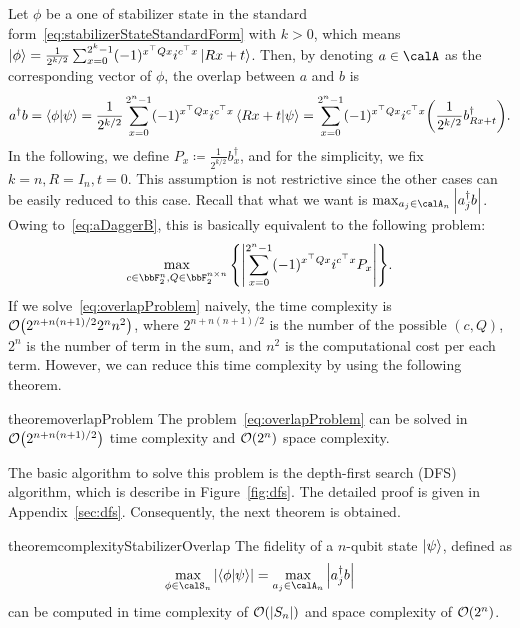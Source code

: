 \documentclass[a4paper, onecolumn, 11pt, longbibliography]{quantumarticle}
\newcommand{\defeq}{\coloneqq}
\begin{document}
Let $\phi$ be a one of stabilizer state
in the standard form~\eqref{eq:stabilizerStateStandardForm}
with $k>0$, which means
$\ket{\phi} = \frac{1}{2^{k/2}}\sum_{x=0}^{2^k-1} (-1)^{x^\top Q x} i^{c^\top x} \ket{Rx+t}$.
Then, by denoting $a \in \calA$ as the corresponding vector of $\phi$,
the overlap between $a$ and $b$ is
\begin{equation}\label{eq:aDaggerB}
  a^\dagger b
  = \braket{\phi}{\psi}
  = \frac{1}{2^{k/2}} \sum_{x=0}^{2^n-1} (-1)^{x^\top Q x} i^{c^\top x} \braket{Rx+t}{\psi}
  = \sum_{x=0}^{2^n-1} (-1)^{x^\top Q x} i^{c^\top x} \qty(\frac{1}{2^{k/2}}b_{Rx+t}^\dagger).
\end{equation}
In the following, we define $P_x \defeq \frac{1}{2^{k/2}}b_x^\dagger$,
and for the simplicity, we fix $k=n,R=I_n,t=0$.
This assumption is not restrictive since
the other cases can be easily reduced to this case.
Recall that what we want is
$\max_{a_j \in \calA_n} \abs{a_j^\dagger b}$.
Owing to~\eqref{eq:aDaggerB},
this is basically equivalent to the following problem:
\begin{equation}\label{eq:overlapProblem}
  \max_{c\in \bbF_2^{n},Q\in \bbF_2^{n \times n}} \qty{ \abs{\sum_{x=0}^{2^n-1} (-1)^{x^\top Q x} i^{c^\top x} P_x} }.
\end{equation}
If we solve~\eqref{eq:overlapProblem} naively,
the time complexity is $\order{2^{n+n(n+1)/2} 2^n n^2}$,
where $2^{n+n(n+1)/2}$ is the number of the possible $(c,Q)$,
$2^n$ is the number of term in the sum,
and $n^2$ is the computational cost per each term.
However, we can reduce this time complexity
by using the following theorem.
\begin{restatable}{theorem}{overlapProblem}
  \label{thm:overlapProblem}
  The problem~\eqref{eq:overlapProblem} can be solved
  in $\order{2^{n+n(n+1)/2}}$ time complexity and $\order{2^n}$ space complexity.
\end{restatable}
The basic algorithm to solve this problem
is the depth-first search (DFS) algorithm,
which is describe in Figure~\ref{fig:dfs}.
The detailed proof is given in Appendix~\ref{sec:dfs}.
Consequently, the next theorem is obtained.
\begin{restatable}{theorem}{complexityStabilizerOverlap}
  \label{thm:complexityStabilizerOverlap}
  The fidelity of a $n$-qubit state $\ket{\psi}$, defined as
  \begin{equation*}
    \max_{\phi \in \calS_n} \abs{\braket{\phi}{\psi}} = \max_{a_j \in \calA_n} \abs{a_j^\dagger b}
  \end{equation*}
  can be computed
  in time complexity of
  $\order{\abs{S_n}}$ and
  space complexity of $\order{2^n}$.
\end{restatable}
\end{document}
